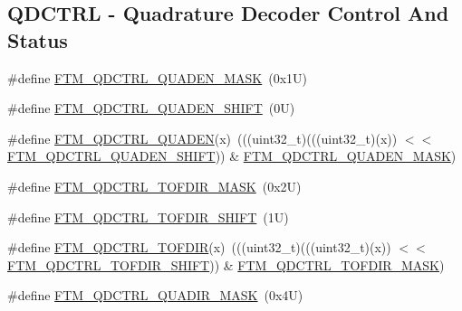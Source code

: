 \subsection*{Q\+D\+C\+T\+RL -\/ Quadrature Decoder Control And Status}
\begin{DoxyCompactItemize}
\item 
\#define \mbox{\hyperlink{group___f_t_m___register___masks_ga130e81d72e324d2e47e6613071606c4c}{F\+T\+M\+\_\+\+Q\+D\+C\+T\+R\+L\+\_\+\+Q\+U\+A\+D\+E\+N\+\_\+\+M\+A\+SK}}~(0x1\+U)
\item 
\#define \mbox{\hyperlink{group___f_t_m___register___masks_gae39df93f832b0d790301964418e74938}{F\+T\+M\+\_\+\+Q\+D\+C\+T\+R\+L\+\_\+\+Q\+U\+A\+D\+E\+N\+\_\+\+S\+H\+I\+FT}}~(0\+U)
\item 
\#define \mbox{\hyperlink{group___f_t_m___register___masks_ga9c3b0a5193cfecdfe0c18cbcfb79ae4a}{F\+T\+M\+\_\+\+Q\+D\+C\+T\+R\+L\+\_\+\+Q\+U\+A\+D\+EN}}(x)~(((uint32\+\_\+t)(((uint32\+\_\+t)(x)) $<$$<$ \mbox{\hyperlink{group___f_t_m___register___masks_gae39df93f832b0d790301964418e74938}{F\+T\+M\+\_\+\+Q\+D\+C\+T\+R\+L\+\_\+\+Q\+U\+A\+D\+E\+N\+\_\+\+S\+H\+I\+FT}})) \& \mbox{\hyperlink{group___f_t_m___register___masks_ga130e81d72e324d2e47e6613071606c4c}{F\+T\+M\+\_\+\+Q\+D\+C\+T\+R\+L\+\_\+\+Q\+U\+A\+D\+E\+N\+\_\+\+M\+A\+SK}})
\item 
\#define \mbox{\hyperlink{group___f_t_m___register___masks_ga0bab5d224dd3ac34bd2c827f96c60b14}{F\+T\+M\+\_\+\+Q\+D\+C\+T\+R\+L\+\_\+\+T\+O\+F\+D\+I\+R\+\_\+\+M\+A\+SK}}~(0x2\+U)
\item 
\#define \mbox{\hyperlink{group___f_t_m___register___masks_ga6d666900b5d312877cc343dbc58969b0}{F\+T\+M\+\_\+\+Q\+D\+C\+T\+R\+L\+\_\+\+T\+O\+F\+D\+I\+R\+\_\+\+S\+H\+I\+FT}}~(1\+U)
\item 
\#define \mbox{\hyperlink{group___f_t_m___register___masks_ga1faa9cb9c6e97319f53df8066a327b2a}{F\+T\+M\+\_\+\+Q\+D\+C\+T\+R\+L\+\_\+\+T\+O\+F\+D\+IR}}(x)~(((uint32\+\_\+t)(((uint32\+\_\+t)(x)) $<$$<$ \mbox{\hyperlink{group___f_t_m___register___masks_ga6d666900b5d312877cc343dbc58969b0}{F\+T\+M\+\_\+\+Q\+D\+C\+T\+R\+L\+\_\+\+T\+O\+F\+D\+I\+R\+\_\+\+S\+H\+I\+FT}})) \& \mbox{\hyperlink{group___f_t_m___register___masks_ga0bab5d224dd3ac34bd2c827f96c60b14}{F\+T\+M\+\_\+\+Q\+D\+C\+T\+R\+L\+\_\+\+T\+O\+F\+D\+I\+R\+\_\+\+M\+A\+SK}})
\item 
\#define \mbox{\hyperlink{group___f_t_m___register___masks_gac6c87f5278eaf7f6c4121ec5a3b316a5}{F\+T\+M\+\_\+\+Q\+D\+C\+T\+R\+L\+\_\+\+Q\+U\+A\+D\+I\+R\+\_\+\+M\+A\+SK}}~(0x4\+U)
\item 

\end{DoxyCompactItemize}

